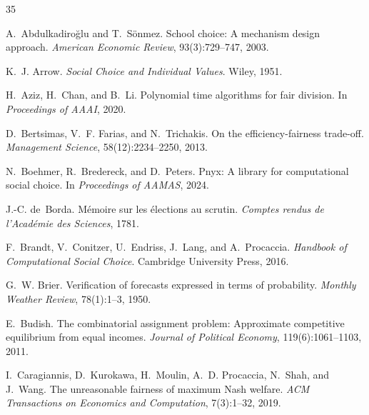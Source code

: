 \documentclass[10pt]{article}
\begin{document}

\begin{thebibliography}{35}

A.~Abdulkadiro\u{g}lu and T.~S\"{o}nmez.
\newblock School choice: A mechanism design approach.
\newblock \emph{American Economic Review}, 93(3):729--747, 2003.

K.~J. Arrow.
\newblock \emph{Social Choice and Individual Values}.
\newblock Wiley, 1951.

H.~Aziz, H.~Chan, and B.~Li.
\newblock Polynomial time algorithms for fair division.
\newblock In \emph{Proceedings of AAAI}, 2020.

D.~Bertsimas, V.~F. Farias, and N.~Trichakis.
\newblock On the efficiency-fairness trade-off.
\newblock \emph{Management Science}, 58(12):2234--2250, 2013.

N.~Boehmer, R.~Bredereck, and D.~Peters.
\newblock Pnyx: A library for computational social choice.
\newblock In \emph{Proceedings of AAMAS}, 2024.

J.-C. de~Borda.
\newblock M\'{e}moire sur les \'{e}lections au scrutin.
\newblock \emph{Comptes rendus de l'Acad\'{e}mie des Sciences}, 1781.

F.~Brandt, V.~Conitzer, U.~Endriss, J.~Lang, and A.~Procaccia.
\newblock \emph{Handbook of Computational Social Choice}.
\newblock Cambridge University Press, 2016.

G.~W. Brier.
\newblock Verification of forecasts expressed in terms of probability.
\newblock \emph{Monthly Weather Review}, 78(1):1--3, 1950.

E.~Budish.
\newblock The combinatorial assignment problem: Approximate competitive
  equilibrium from equal incomes.
\newblock \emph{Journal of Political Economy}, 119(6):1061--1103, 2011.

I.~Caragiannis, D.~Kurokawa, H.~Moulin, A.~D. Procaccia, N.~Shah, and
  J.~Wang.
\newblock The unreasonable fairness of maximum Nash welfare.
\newblock \emph{ACM Transactions on Economics and Computation}, 7(3):1--32, 2019.


\end{thebibliography}
\end{document}
